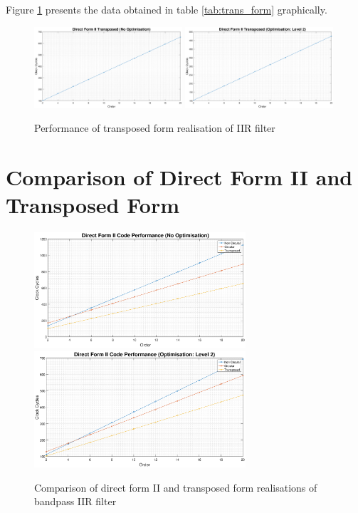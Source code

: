 \documentclass{article}
\begin{document}
Figure \ref{fig:trans_form} presents the data obtained in table \ref{tab:trans_form} graphically. 

\begin{figure}[H]
    \centering
    \includegraphics[width = 0.49\textwidth]{trans_no_opt}
    \includegraphics[width = 0.49\textwidth]{trans_opt}
    \caption{Performance of transposed form realisation of IIR filter}
    \label{fig:trans_form}
\end{figure}

\section{Comparison of Direct Form II and Transposed Form}

\begin{figure}[H]
    \centering
    \includegraphics[width = 0.70\textwidth]{no_opt_all}
    \includegraphics[width = 0.70\textwidth]{opt_all}
    \caption{Comparison of direct form II and transposed form realisations of bandpass IIR filter}
    \label{fig:compare}
\end{figure}
\end{document}
